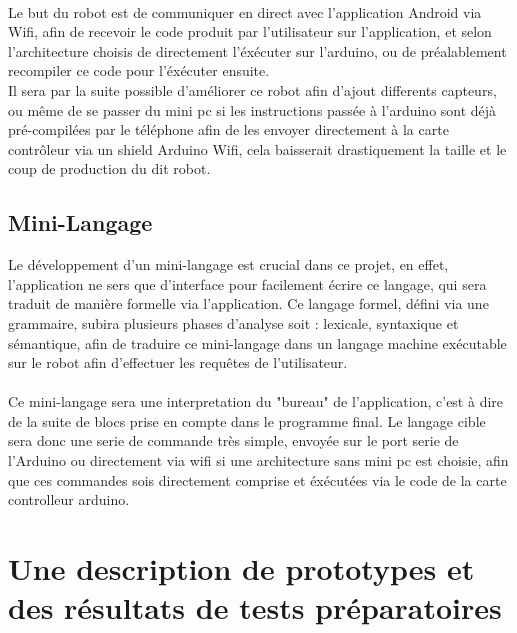 \documentclass[a4paper]{article}
\begin{document}
\paragraph{}
Le but du robot est de communiquer en direct avec l'application Android via Wifi, afin de recevoir le code produit par l'utilisateur sur l'application, et selon l'architecture choisis de directement l'éxécuter sur l'arduino, ou de préalablement recompiler ce code pour l'éxécuter ensuite.\\
Il sera par la suite possible d'améliorer ce robot afin d'ajout differents capteurs, ou même de se passer du mini pc si les instructions passée à l'arduino sont déjà pré-compilées par le téléphone afin de les envoyer directement à la carte contrôleur via un shield Arduino Wifi, cela baisserait drastiquement la taille et le coup de production du dit robot.

\subsection{Mini-Langage} 

Le développement d’un mini-langage est crucial dans ce projet, en effet, l’application ne sers que d’interface pour facilement écrire ce langage, qui sera traduit de manière formelle via l’application. Ce langage formel, défini via une grammaire, subira plusieurs phases d’analyse soit : lexicale, syntaxique et sémantique, afin de traduire ce mini-langage dans un langage machine exécutable sur le robot afin d’effectuer les requêtes de l’utilisateur.

\paragraph{}
Ce mini-langage sera une interpretation du "bureau" de l'application, c'est à dire de la suite de blocs prise en compte dans le programme final. Le langage cible sera donc une serie de commande très simple, envoyée sur le port serie de l'Arduino ou directement via wifi si une architecture sans mini pc est choisie, afin que ces commandes sois directement comprise et éxécutées via le code de la carte controlleur arduino. 

\section{Une description de prototypes et des résultats de tests préparatoires}
\end{document}

